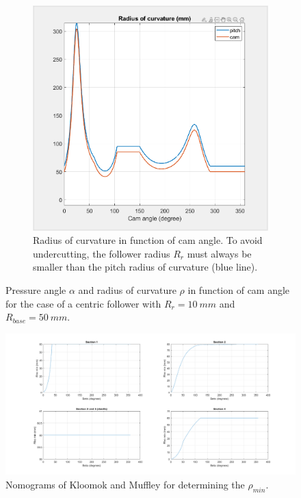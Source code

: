 \documentclass[a4paper]{article}
\begin{document}
\begin{figure}
\begin{subfigure}{.7\textwidth}
		\includegraphics[width=\textwidth]{radzonder.png}
		\caption{Radius of curvature in function of cam angle. To avoid undercutting, the follower radius \(R_r\) must always be smaller than the pitch radius of curvature (blue line).}
		\label{fig:radzonder}
	\end{subfigure}
	
	\caption{Pressure angle \(\alpha\) and radius of curvature \(\rho\) in function of cam angle for the case of a centric follower with \(R_r=10~mm\) and \(R_{base}=50~mm\).}
	\label{fig:geozonder}
	
\end{figure}

\begin{figure}
	\centering
	
	\includegraphics[width=\textwidth]{nomogram2.png}
	
	
	\caption{Nomograms of Kloomok and Muffley for determining the \(\rho_{min}\).}
	\label{fig:nomogram2}
\end{figure}
\end{document}
